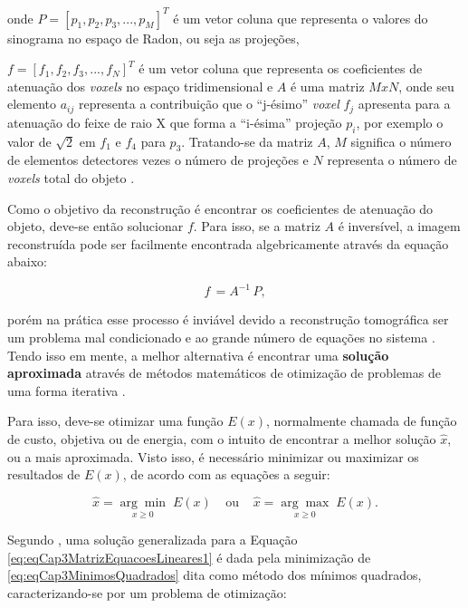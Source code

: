 \noindent onde $P = [p_{1},p_{2},p_{3},...,p_{M}]^{T}$ é um vetor coluna que representa o valores do sinograma no espaço de Radon, ou seja as projeções, {$f = [f_{1},f_{2},f_{3},...,f_{N}]^{T}$ é um vetor coluna que representa os coeficientes de atenuação dos \textit{voxels} no espaço tridimensional e $A$ é uma matriz $MxN$, onde seu elemento $a_{ij}$ representa a contribuição que o ``j-ésimo'' \textit{voxel} $f_{j}$ apresenta para a atenuação do feixe de raio X que forma a ``i-ésima'' projeção $p_{i}$, por exemplo o valor de $\sqrt{2}$ em $f_{1}$ e $f_{4}$ para $p_{3}$. Tratando-se da matriz $A$, $M$ significa o número de elementos detectores vezes o número de projeções e $N$ representa o número de \textit{voxels} total do objeto \cite{zeng2010medical,levakhina2014three}.

Como o objetivo da reconstrução é encontrar os coeficientes de atenuação do objeto, deve-se então solucionar $f$. Para isso, se a matriz $A$ é inversível, a imagem reconstruída pode ser facilmente encontrada algebricamente através da equação abaixo:

 \begin{equation}
 f \, = A^{-1} \, P,
 \label{eq:eqCap3MatrizEquacoesLineares2}
 \end{equation}      

\noindent porém na prática esse processo é inviável devido a reconstrução tomográfica ser um problema mal condicionado e ao grande número de equações no sistema \cite{levakhina2014three}. Tendo isso em mente, a melhor alternativa é encontrar uma \textbf{solução aproximada} através de métodos matemáticos de otimização de problemas de uma forma iterativa \cite{buzug2008computed}.  

Para isso, deve-se otimizar uma função $E(x)$, normalmente chamada de função de custo, objetiva ou de energia, com o intuito de encontrar a melhor solução $\hat{x}$, ou a mais aproximada. Visto isso, é necessário minimizar ou maximizar os resultados de $E(x)$, de acordo com as equações a seguir:
 
\begin{equation}
\hat{x} = \underset{x\geq 0}{\arg\min} \; E(x) \;\;\;\; \text{ou} \;\;\;\; \hat{x} = \underset{x\geq 0}{\arg\max} \; E(x).
\label{eq:eqCap3Minimizacao}
\end{equation} 

Segundo , uma solução generalizada para a Equação \ref{eq:eqCap3MatrizEquacoesLineares1} é dada pela minimização de \eqref{eq:eqCap3MinimosQuadrados} dita como método dos mínimos quadrados, caracterizando-se por um problema de otimização:

}
